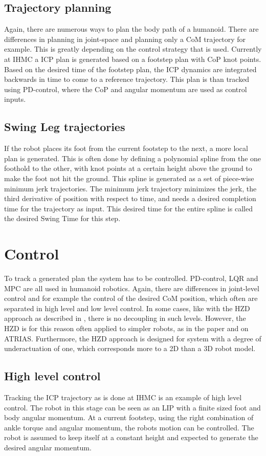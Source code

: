 \subsection{Trajectory planning}
Again, there are numerous ways to plan the body path of a humanoid. There are differences in planning in joint-space and planning only a \ac{CoM} trajectory for example. This is greatly depending on the control strategy that is used. Currently at IHMC a \ac{ICP} plan is generated based on a footstep plan with \ac{CoP} knot points. Based on the desired time of the footstep plan, the \ac{ICP} dynamics are integrated backwards in time to come to a reference trajectory. This plan is than tracked using PD-control, where the \ac{CoP} and angular momentum are used as control inputs. 

\subsection{Swing Leg trajectories}
If the robot places its foot from the current footstep to the next, a more local plan is generated. This is often done by defining a polynomial spline from the one foothold to the other, with knot points at a certain height above the ground to make the foot not hit the ground. This spline is generated as a set of piece-wise minimum jerk trajectories. The minimum jerk trajectory minimizes the jerk, the third derivative of position with respect to time, and needs a desired completion time for the trajectory as input. This desired time for the entire spline is called the desired Swing Time for this step. 

\section{Control}
To track a generated plan the system has to be controlled. PD-control, LQR and MPC are all used in humanoid robotics. Again, there are differences in joint-level control and for example the control of the desired \ac{CoM} position, which often are separated in high level and low level control. In some cases, like with the \ac{HZD} approach as described in \cite{westervelt2003hybrid}, there is no decoupling in such levels. However, the \ac{HZD} is for this reason often applied to simpler robots, as in the paper and on ATRIAS. Furthermore, the \ac{HZD} approach is designed for system with a degree of underactuation of one, which corresponds more to a \ac{2D} than a \ac{3D} robot model. 
\subsection{High level control}
Tracking the \ac{ICP} trajectory as is done at IHMC is an example of high level control. The robot in this stage can be seen as an \ac{LIP} with a finite sized foot and body angular momentum. At a current footstep, using the right combination of ankle torque and angular momentum, the robots motion can be controlled. The robot is assumed to keep itself at a constant height and expected to generate the desired angular momentum. 
